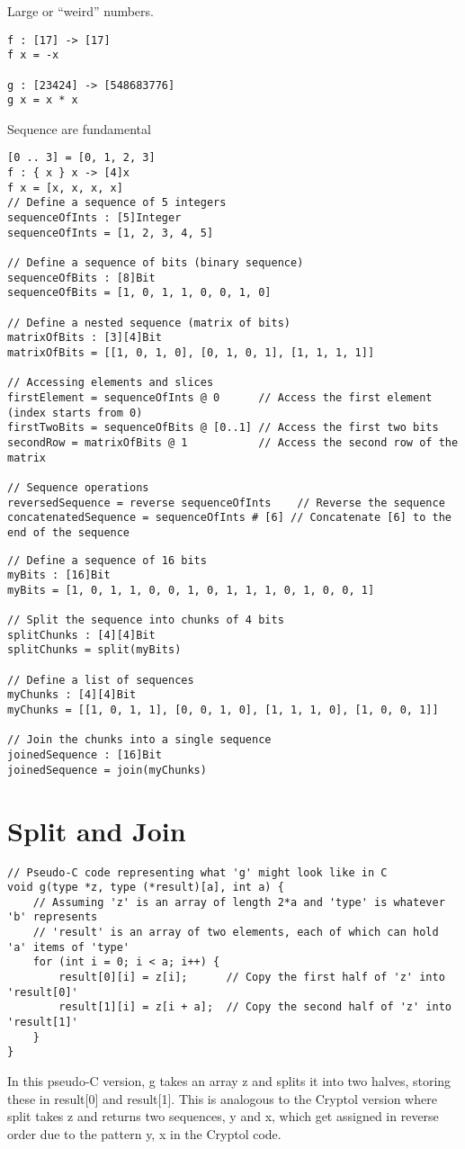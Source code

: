 Large or ``weird'' numbers.
\begin{lstlisting}[style=haskell]
f : [17] -> [17]
f x = -x

g : [23424] -> [548683776]
g x = x * x
\end{lstlisting}

Sequence are fundamental
\begin{lstlisting}[style=haskell]
[0 .. 3] = [0, 1, 2, 3]
f : { x } x -> [4]x
f x = [x, x, x, x]
// Define a sequence of 5 integers
sequenceOfInts : [5]Integer
sequenceOfInts = [1, 2, 3, 4, 5]

// Define a sequence of bits (binary sequence)
sequenceOfBits : [8]Bit
sequenceOfBits = [1, 0, 1, 1, 0, 0, 1, 0]

// Define a nested sequence (matrix of bits)
matrixOfBits : [3][4]Bit
matrixOfBits = [[1, 0, 1, 0], [0, 1, 0, 1], [1, 1, 1, 1]]

// Accessing elements and slices
firstElement = sequenceOfInts @ 0      // Access the first element (index starts from 0)
firstTwoBits = sequenceOfBits @ [0..1] // Access the first two bits
secondRow = matrixOfBits @ 1           // Access the second row of the matrix

// Sequence operations
reversedSequence = reverse sequenceOfInts    // Reverse the sequence
concatenatedSequence = sequenceOfInts # [6] // Concatenate [6] to the end of the sequence
\end{lstlisting}

\newpage
\begin{lstlisting}[style=haskell]
// Define a sequence of 16 bits
myBits : [16]Bit
myBits = [1, 0, 1, 1, 0, 0, 1, 0, 1, 1, 1, 0, 1, 0, 0, 1]

// Split the sequence into chunks of 4 bits
splitChunks : [4][4]Bit
splitChunks = split(myBits)

// Define a list of sequences
myChunks : [4][4]Bit
myChunks = [[1, 0, 1, 1], [0, 0, 1, 0], [1, 1, 1, 0], [1, 0, 0, 1]]

// Join the chunks into a single sequence
joinedSequence : [16]Bit
joinedSequence = join(myChunks)
\end{lstlisting}

\newpage
\section{Split and Join}
\begin{lstlisting}[style=C]
// Pseudo-C code representing what 'g' might look like in C
void g(type *z, type (*result)[a], int a) {
	// Assuming 'z' is an array of length 2*a and 'type' is whatever 'b' represents
	// 'result' is an array of two elements, each of which can hold 'a' items of 'type'
	for (int i = 0; i < a; i++) {
		result[0][i] = z[i];      // Copy the first half of 'z' into 'result[0]'
		result[1][i] = z[i + a];  // Copy the second half of 'z' into 'result[1]'
	}
}
\end{lstlisting}
In this pseudo-C version, g takes an array z and splits it into two halves, storing these in result[0] and result[1]. This is analogous to the Cryptol version where split takes z and returns two sequences, y and x, which get assigned in reverse order due to the pattern {y, x} in the Cryptol code.

